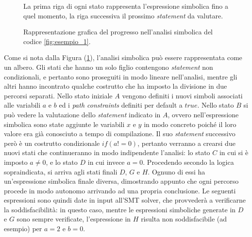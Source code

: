 \documentclass[Lau, oneside]{sapthesis}%
\begin{document}
\newpage
\begin{figure}
\newline
\caption{Rappresentazione grafica del progresso nell'analisi simbolica del codice \ref{fig:esempio_1}. \cite{ref:survey}}{La prima riga di ogni stato rappresenta l'espressione simbolica fino a quel momento, la riga successiva il prossimo \textit{statement} da valutare.}
\label{fig:esempio_2}
\end{figure}
Come si nota dalla Figura (\ref{fig:esempio_2}), l'analisi simbolica può essere rappresentata come un albero.
\newline
Gli stati che hanno un solo figlio contengono \textit{statement} non condizionali, e pertanto sono proseguiti in modo lineare nell'analisi, mentre gli altri hanno incontrato qualche costrutto che ha imposto la divisione in due percorsi separati.
\newline \newline
Nello stato iniziale $A$ vengono definiti i nuovi simboli associati alle variabili $a$ e $b$ ed i \textit{path constraints} definiti per default a $true$.
\newline \newline
Nello stato $B$ si può vedere la valutazione dello \textit{statement} indicato in $A$, ovvero nell'espressione simbolica sono state aggiunte le variabili $x$ e $y$ in modo concreto poiché il loro valore era già conosciuto a tempo di compilazione.
\newline
Il suo \textit{statement} successivo però è un costrutto condizionale $if(a!=0)$, pertanto verranno a crearsi due nuovi stati che continueranno in modo indipendente l'analisi: lo stato $C$ in cui si è imposto $a\neq0$, e lo stato $D$ in cui invece $a=0$.
\newline \newline
Procedendo secondo la logica sopraindicata, si arriva agli stati finali $D$, $G$ e $H$.
\newline
Ognuno di essi ha un'espressione simbolica finale diversa, dimostrando appunto che ogni percorso procede in modo autonomo arrivando ad una propria conclusione.
\newline
Le seguenti espressioni sono quindi date in input all'SMT solver, che provvederà a verificarne la soddisfacibilità: in questo caso, mentre le espressioni simboliche generate in $D$ e $G$ sono sempre verificate, l'espressione in $H$ risulta non soddisfacibile (ad esempio) per $a=2$ e $b=0$.
\end{document}
